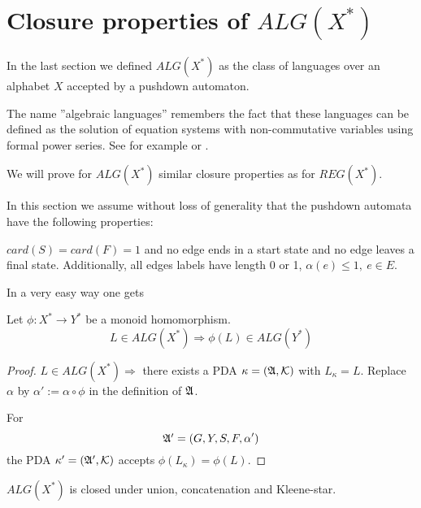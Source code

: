 \section{Closure properties of $ALG(X^*)$}

In the last section we defined $ALG(X^*)$ as the class of languages over an
alphabet $X$ accepted by a pushdown automaton.

The name ''algebraic languages'' remembers the fact that these languages can be
defined as the solution of equation systems with non-commutative variables using
formal power series. See for example \cite{SaSo} or \cite{Berstel77}.

We will prove for $ALG(X^*)$ similar closure properties as for $REG(X^*)$.

In this section we assume without loss of generality that the pushdown automata
have the following properties:

$card(S) = card(F) = 1$ and no edge ends in a start state and no edge leaves a
final state. Additionally, all edges labels have length 0 or 1, $\alpha(e) \leq
1,\ e \in E$.

In a very easy way one gets

\begin{theorem}
Let $\phi : X^* \to Y^*$ be a monoid homomorphism.
\[ L \in ALG(X^*) \Rightarrow \phi(L) \in ALG(Y^*) \]
\end{theorem} 

\begin{proof}
$L \in ALG(X^*) \Rightarrow$ there exists a PDA $\kappa = (\mbox{$\mathfrak{A}$}, \mbox{$\mathcal{K}$})$
with $L_{\kappa} = L$. Replace $\alpha$ by $\alpha' := \alpha \circ \phi$ in
the definition of $\mbox{$\mathfrak{A}$}$. 

For
\[ \mbox{$\mathfrak{A'}$} = (G, Y, S, F, \alpha') \]
the PDA $\kappa' = (\mbox{$\mathfrak{A'}$}, \mbox{$\mathcal{K}$})$ accepts $\phi(L_{\kappa}) = \phi(L)$.
\end{proof}


\bigskip
\begin{theorem}
$ALG(X^*)$ is closed under union, concatenation and Kleene-star.
\end{theorem}

